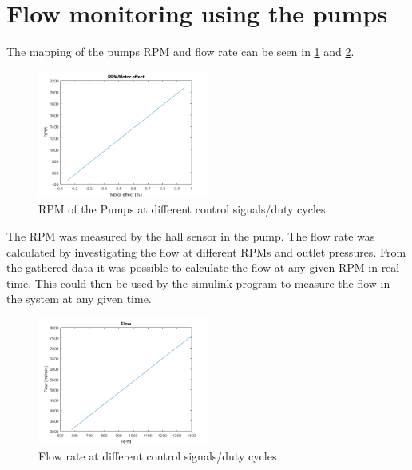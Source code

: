 \section{Flow monitoring using the pumps}
The mapping of the pumps RPM and flow rate can be seen in \ref{fig:RPM} and \ref{fig:Flowrate}.
\begin{figure}[H]
    \centering
    \includegraphics[width=0.5\textwidth]{RPM.png}
    \caption{RPM of the Pumps at different control signals/duty cycles}
    \label{fig:RPM}
\end{figure}
The RPM was measured by the hall sensor in the pump. The flow rate was calculated by investigating the flow at different RPMs and outlet pressures. From the gathered data it was possible to calculate the flow at any given RPM in real-time. This could then be used by the simulink program to measure the flow in the system at any given time.  
\begin{figure}[H]
    \centering
    \includegraphics[width=0.5\textwidth]{Flow.png}
    \caption{Flow rate at different control signals/duty cycles}
    \label{fig:Flowrate}
\end{figure}

\newpage
